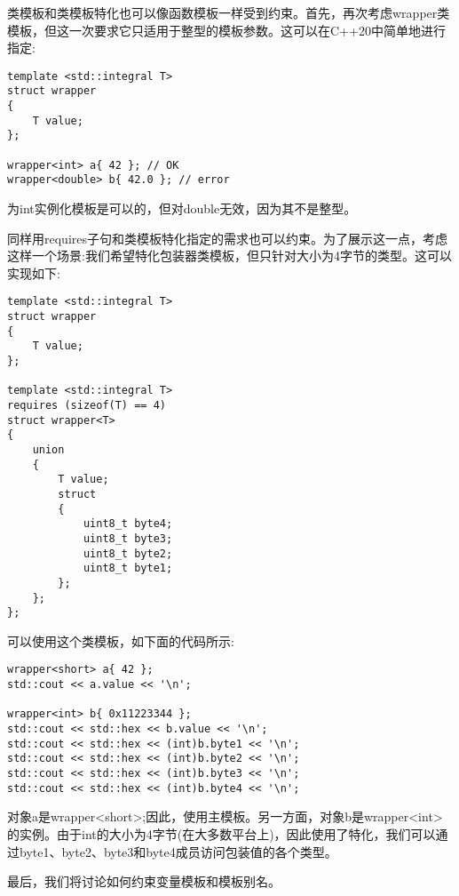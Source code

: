 类模板和类模板特化也可以像函数模板一样受到约束。首先，再次考虑wrapper类模板，但这一次要求它只适用于整型的模板参数。这可以在C++20中简单地进行指定:

\begin{lstlisting}[style=styleCXX]
template <std::integral T>
struct wrapper
{
	T value;
};

wrapper<int> a{ 42 }; // OK
wrapper<double> b{ 42.0 }; // error
\end{lstlisting}

为int实例化模板是可以的，但对double无效，因为其不是整型。

同样用requires子句和类模板特化指定的需求也可以约束。为了展示这一点，考虑这样一个场景:我们希望特化包装器类模板，但只针对大小为4字节的类型。这可以实现如下:

\begin{lstlisting}[style=styleCXX]
template <std::integral T>
struct wrapper
{
	T value;
};

template <std::integral T>
requires (sizeof(T) == 4)
struct wrapper<T>
{
	union
	{
		T value;
		struct
		{
			uint8_t byte4;
			uint8_t byte3;
			uint8_t byte2;
			uint8_t byte1;
		};
	};
};
\end{lstlisting}

可以使用这个类模板，如下面的代码所示:

\begin{lstlisting}[style=styleCXX]
wrapper<short> a{ 42 };
std::cout << a.value << '\n';

wrapper<int> b{ 0x11223344 };
std::cout << std::hex << b.value << '\n';
std::cout << std::hex << (int)b.byte1 << '\n';
std::cout << std::hex << (int)b.byte2 << '\n';
std::cout << std::hex << (int)b.byte3 << '\n';
std::cout << std::hex << (int)b.byte4 << '\n';
\end{lstlisting}

对象a是wrapper<short>;因此，使用主模板。另一方面，对象b是wrapper<int>的实例。由于int的大小为4字节(在大多数平台上)，因此使用了特化，我们可以通过byte1、byte2、byte3和byte4成员访问包装值的各个类型。

最后，我们将讨论如何约束变量模板和模板别名。




































































